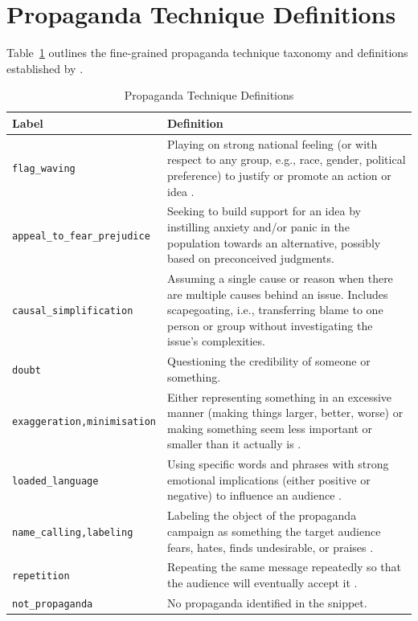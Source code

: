 \documentclass[12pt, a4paper]{article}
\begin{document}
\newpage
\appendix


\section{Propaganda Technique Definitions}
\label{app:taxonomy}

Table~\ref{tab:propaganda_taxonomy} outlines the fine-grained propaganda technique taxonomy and definitions established by \cite{dasan2020}.

\begin{table}[htbp]
  \centering
  \caption{Propaganda Technique Definitions \cite{dasan2020}}
  \label{tab:propaganda_taxonomy}
  \small
  \begin{tabularx}{\textwidth}{l X}
    \toprule
    \textbf{Label} & \textbf{Definition} \\
    \midrule
    \texttt{flag\_waving} & Playing on strong national feeling (or with respect to any group, e.g., race, gender, political preference) to justify or promote an action or idea \cite{hobbs2014}. \\
    \addlinespace
    \texttt{appeal\_to\_fear\_prejudice} & Seeking to build support for an idea by instilling anxiety and/or panic in the population towards an alternative, possibly based on preconceived judgments. \\
    \addlinespace
    \texttt{causal\_simplification} & Assuming a single cause or reason when there are multiple causes behind an issue. Includes scapegoating, i.e., transferring blame to one person or group without investigating the issue's complexities. \\
    \addlinespace
    \texttt{doubt} & Questioning the credibility of someone or something. \\
    \addlinespace
    \texttt{exaggeration,minimisation} & Either representing something in an excessive manner (making things larger, better, worse) or making something seem less important or smaller than it actually is \cite{jowett2012}. \\
    \addlinespace
    \texttt{loaded\_language} & Using specific words and phrases with strong emotional implications (either positive or negative) to influence an audience \cite{weston2000}. \\
    \addlinespace
    \texttt{name\_calling,labeling} & Labeling the object of the propaganda campaign as something the target audience fears, hates, finds undesirable, or praises \cite{miller1939}. \\
    \addlinespace
    \texttt{repetition} & Repeating the same message repeatedly so that the audience will eventually accept it \cite{miller1939, torok2015}. \\
    \addlinespace
    \texttt{not\_propaganda} & No propaganda identified in the snippet. \\
    \bottomrule
  \end{tabularx}
\end{table}
\end{document}
